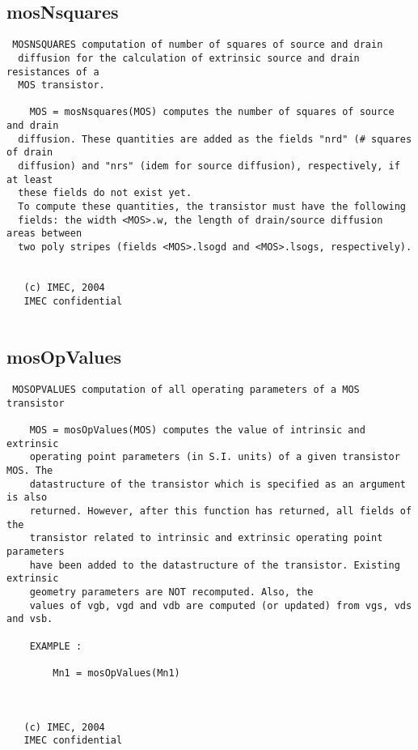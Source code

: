 \subsection{mosNsquares}
\label{sec:mosNsquares}
\begin{verbatim}
 MOSNSQUARES computation of number of squares of source and drain 
  diffusion for the calculation of extrinsic source and drain resistances of a
  MOS transistor. 
 
    MOS = mosNsquares(MOS) computes the number of squares of source and drain 
  diffusion. These quantities are added as the fields "nrd" (# squares of drain
  diffusion) and "nrs" (idem for source diffusion), respectively, if at least
  these fields do not exist yet. 
  To compute these quantities, the transistor must have the following
  fields: the width <MOS>.w, the length of drain/source diffusion areas between
  two poly stripes (fields <MOS>.lsogd and <MOS>.lsogs, respectively).
 
 
   (c) IMEC, 2004
   IMEC confidential 
 

\end{verbatim}

\newpage
\subsection{mosOpValues}
\label{sec:mosOpValues}
\begin{verbatim}
 MOSOPVALUES computation of all operating parameters of a MOS transistor
 
    MOS = mosOpValues(MOS) computes the value of intrinsic and extrinsic
    operating point parameters (in S.I. units) of a given transistor MOS. The
    datastructure of the transistor which is specified as an argument is also
    returned. However, after this function has returned, all fields of the
    transistor related to intrinsic and extrinsic operating point parameters
    have been added to the datastructure of the transistor. Existing extrinsic
    geometry parameters are NOT recomputed. Also, the
    values of vgb, vgd and vdb are computed (or updated) from vgs, vds and vsb. 
                                                                           
    EXAMPLE :                                                                
 
        Mn1 = mosOpValues(Mn1)                          
 
 
 
   (c) IMEC, 2004
   IMEC confidential 
 

\end{verbatim}

